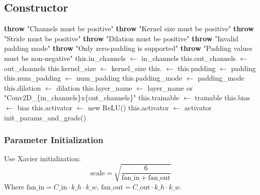 \documentclass{article}
\begin{document}
\subsection{Constructor}
\begin{algorithm}
\caption{Conv2d Constructor}
\begin{algorithmic}[1]
        \State \textbf{throw} "Channels must be positive"
    \EndIf
        \State \textbf{throw} "Kernel size must be positive"
    \EndIf
        \State \textbf{throw} "Stride must be positive"
    \EndIf
        \State \textbf{throw} "Dilation must be positive"
    \EndIf
        \State \textbf{throw} "Invalid padding mode"
    \EndIf
        \State \textbf{throw} "Only zero-padding is supported"
    \EndIf
        \State \textbf{throw} "Padding values must be non-negative"
    \EndIf
    \State this.in\_channels $\gets$ in\_channels
    \State this.out\_channels $\gets$ out\_channels
    \State this.kernel\_size $\gets$ kernel\_size
    \State this. $\gets$ 
    \State this.padding $\gets$ padding
    \State this.num\_padding $\gets$ num\_padding
    \State this.padding\_mode $\gets$ padding\_mode
    \State this.dilation $\gets$ dilation
    \State this.layer\_name $\gets$ layer\_name or "Conv2D\_\{in\_channels\}x\{out\_channels\}"
    \State this.trainable $\gets$ trainable
    \State this.bias $\gets$ bias
        \State this.activator $\gets$ new ReLU()
    \Else
        \State this.activator $\gets$ activator
    \EndIf
    \State init\_params\_and\_grads()
\EndFunction
\end{algorithmic}
\end{algorithm}

\subsubsection{Parameter Initialization}
Use Xavier initialization:
\begin{equation}
\text{scale} = \sqrt{\frac{6}{\text{fan}\_{\text{in}} + \text{fan}\_{\text{out}}}}
\end{equation}
Where $\text{fan}\_{\text{in}} = C\_{\text{in}} \cdot k\_h \cdot k\_w$, $\text{fan}\_{\text{out}} = C\_{\text{out}} \cdot k\_h \cdot k\_w$.
\end{document}
